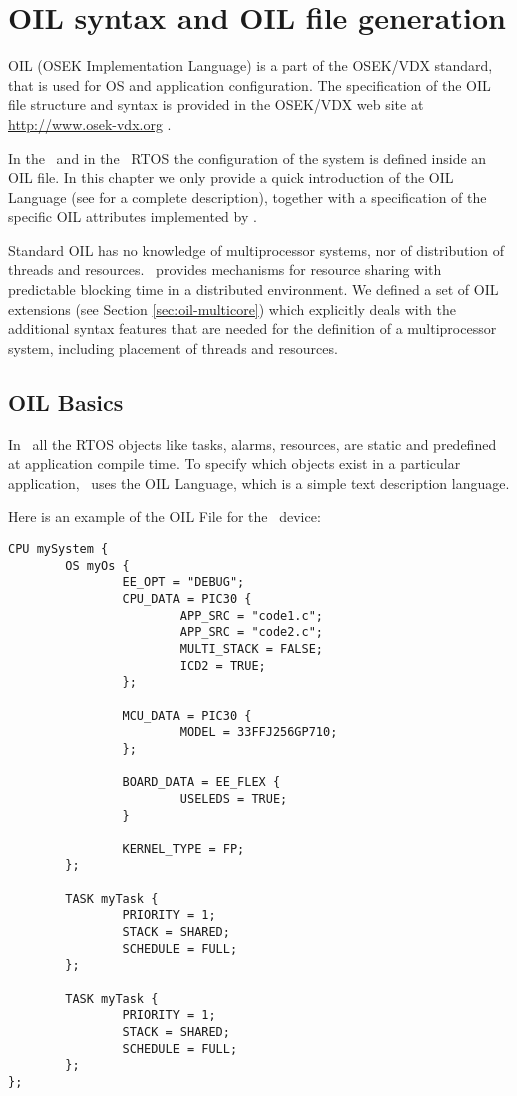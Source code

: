 \chapter{OIL syntax and OIL file generation}
\label{cha:oil-syntax}

OIL (OSEK Implementation Language) is a part of the OSEK/VDX standard,
that is used for OS and application configuration. The specification
of the OIL file structure and syntax is provided in the OSEK/VDX web
site at \url{http://www.osek-vdx.org} \cite{OSEKOIL}.

In the \rtd\ and in the \ee\ RTOS the configuration of the system is
defined inside an OIL file. In this chapter we only provide a quick
introduction of the OIL Language (see \cite{OSEKOIL} for a complete
description), together with a specification of the specific OIL
attributes implemented by \rtd.

Standard OIL has no knowledge of multiprocessor systems, nor of 
distribution of threads and resources. \ee\ provides mechanisms for 
resource sharing with predictable blocking time in a distributed 
environment. We defined a set of OIL extensions (see Section 
\ref{sec:oil-multicore}) which explicitly deals with the additional 
syntax features that are needed for the definition of a multiprocessor 
system, including placement of threads and resources. 

\section{OIL Basics}

In \ee\ all the RTOS objects like tasks, alarms, resources, are static
and predefined at application compile time. To specify which objects
exist in a particular application, \ee\ uses the OIL Language, which
is a simple text description language.

Here is an example of the OIL File for the \dspic\ device:

\begin{lstlisting}
CPU mySystem {
        OS myOs {
                EE_OPT = "DEBUG";
                CPU_DATA = PIC30 {
                        APP_SRC = "code1.c";
                        APP_SRC = "code2.c";
                        MULTI_STACK = FALSE;
                        ICD2 = TRUE;
                };

                MCU_DATA = PIC30 {
                        MODEL = 33FFJ256GP710;
                };

                BOARD_DATA = EE_FLEX {
                        USELEDS = TRUE;
                }

                KERNEL_TYPE = FP;
        };

        TASK myTask {
                PRIORITY = 1;
                STACK = SHARED;
                SCHEDULE = FULL;
        };

        TASK myTask {
                PRIORITY = 1;
                STACK = SHARED;
                SCHEDULE = FULL;
        };
};
\end{lstlisting}


